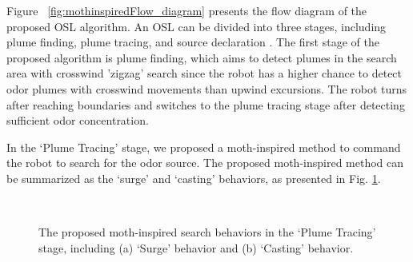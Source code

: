 Figure ~\ref{fig:mothinspiredFlow_diagram} presents the flow diagram of the proposed OSL algorithm. An OSL can be divided into three stages, including plume finding, plume tracing, and source declaration \cite{naeem2007chemical}. The first stage of the proposed algorithm is plume finding, which aims to detect plumes in the search area with crosswind 'zigzag' search \cite{wang2022robotic} since the robot has a higher chance to detect odor plumes with crosswind movements than upwind excursions. The robot turns after reaching boundaries and switches to the plume tracing stage after detecting sufficient odor concentration.

In the `Plume Tracing' stage, we proposed a moth-inspired method to command the robot to search for the odor source. The proposed moth-inspired method \cite{farrell2005chemical} can be summarized as the `surge' and `casting' behaviors, as presented in Fig. \ref{fig:olfactionSurgeCasting}. 

\begin{figure}[h]

\ \\
\vspace*{-.18in}

\begin{center}
    \hspace*{0.04in}
    \hspace*{0.04in}
\end{center}
\vspace{-.1in}

\caption
{The proposed moth-inspired search behaviors in the `Plume Tracing' stage, including (a) `Surge' behavior and (b) `Casting' behavior.}
\label{fig:olfactionSurgeCasting}
\end{figure}

